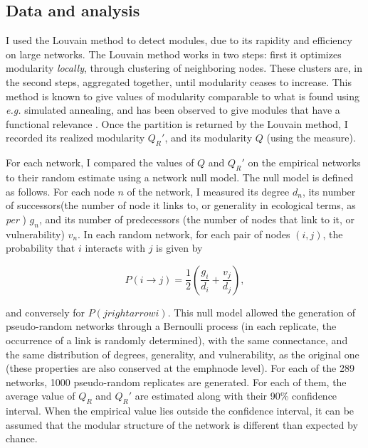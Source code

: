 \documentclass[12pt,oneside]{article}
\begin{document}
\subsection{Data and analysis}

I used the Louvain method \cite{blondel_fast_2008} to detect modules, due to
its rapidity and efficiency on large networks. The Louvain method works in two
steps: first it optimizes modularity \emph{locally}, through clustering of
neighboring nodes. These clusters are, in the second steps, aggregated
together, until modularity ceases to increase. This method is known to give
values of modularity comparable to what is found using \emph{e.g.} simulated
annealing, and has been observed to give modules that have a functional
relevance \cite{blonder_fast_2000}.  Once the partition is returned by the
Louvain method, I recorded its realized modularity $Q_R'$, and its modularity
$Q$ (using the \textcite{newman_finding_2004} measure).

For each network, I compared the values of $Q$ and $Q_R'$ on the empirical
networks to their random estimate using a network null model. The null model is
defined as follows. For each node $n$ of the network, I measured its degree
$d_n$, its number of successors(the number of node it links to, or generality
in ecological terms, as \emph{per} \cite{schoener_food_1989}) $g_n$, and its
number of predecessors (the number of nodes that link to it, or vulnerability)
$v_n$. In each random network, for each pair of nodes $(i,j)$, the probability
that $i$ interacts with $j$ is given by

\begin{equation}
	P(i\rightarrow j) = \frac{1}{2}\left(\frac{g_i}{d_i}+\frac{v_j}{d_j}\right),
	\label{e:null}
\end{equation}

\noindent and conversely for $P(jrightarrow i)$. This null model allowed the generation
of pseudo-random networks through a Bernoulli process (in each replicate, the
occurrence of a link is randomly determined), with the same connectance, and
the same distribution of degrees, generality, and vulnerability, as the
original one (these properties are also conserved at the emph{node} level).
For each of the 289 networks, 1000 pseudo-random replicates are generated. For
each of them, the average value of $Q_R$ and $Q_R'$ are estimated along with
their 90\% confidence interval. When the empirical value lies outside the
confidence interval, it can be assumed that the modular structure of the network is
different than expected by chance.
\end{document}
